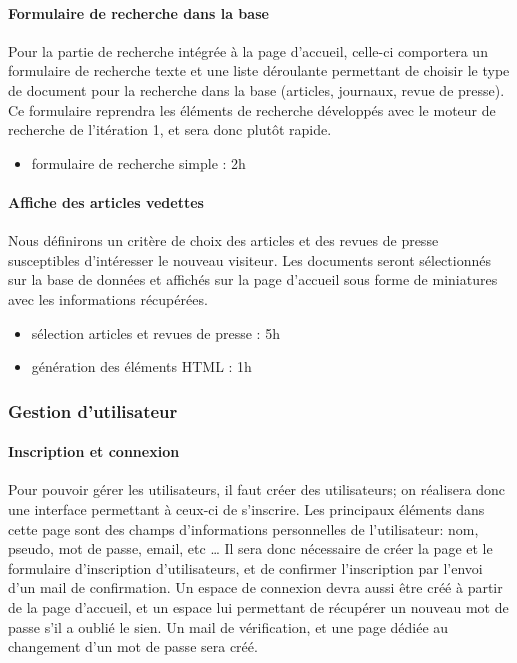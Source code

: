 		\paragraph{Formulaire de recherche dans la base}
			Pour la partie de recherche intégrée à la page d’accueil, celle-ci comportera un formulaire de recherche texte et une liste déroulante permettant de choisir le type de document pour la recherche dans la base (articles, journaux, revue de presse). Ce formulaire reprendra les éléments de recherche développés avec le moteur de recherche de l'itération 1, et sera donc plutôt rapide.

			\begin{itemize}
				\item formulaire de recherche simple : 2h
			\end{itemize}

		\paragraph{Affiche des articles vedettes} 
		\label{subsubsec:acc_article}
			Nous définirons un critère de choix des articles et des revues de presse susceptibles d'intéresser le nouveau visiteur. Les documents seront sélectionnés sur la base de données et affichés sur la page d'accueil sous forme de miniatures avec les informations récupérées.

			\begin{itemize}
				\item sélection articles et revues de presse : 5h
				\item génération des éléments HTML : 1h
			\end{itemize}

	\subsubsection{Gestion d'utilisateur}
	\label{subsubsec:utilisateur}
		\paragraph{Inscription et connexion}
			Pour pouvoir gérer les utilisateurs, il faut créer des utilisateurs; on réalisera donc une interface permettant à ceux-ci de s'inscrire. Les principaux éléments dans cette page sont des champs d’informations personnelles de l’utilisateur: nom, pseudo, mot de passe, email, etc … Il sera donc nécessaire de créer la page et le formulaire d'inscription d'utilisateurs, et de confirmer l'inscription par l'envoi d'un mail de confirmation. Un espace de connexion devra aussi être créé à partir de la page d'accueil, et un espace lui permettant de récupérer un nouveau mot de passe s'il a oublié le sien. Un mail de vérification, et une page dédiée au changement d'un mot de passe sera créé.

